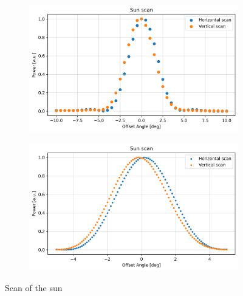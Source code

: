\begin{figure}[H]
    \centering
    \begin{subfigure}[t]{0.45\linewidth}
        \includegraphics[width=\linewidth]{assets/sun_scan_low_res.png}
    \end{subfigure}
    \begin{subfigure}[t]{0.45\linewidth}
        \includegraphics[width=\linewidth]{assets/sun_scan_high_res.png}
    \end{subfigure}
    \caption{Scan of the sun}
    \label{fig:sun_scan}
\end{figure}

